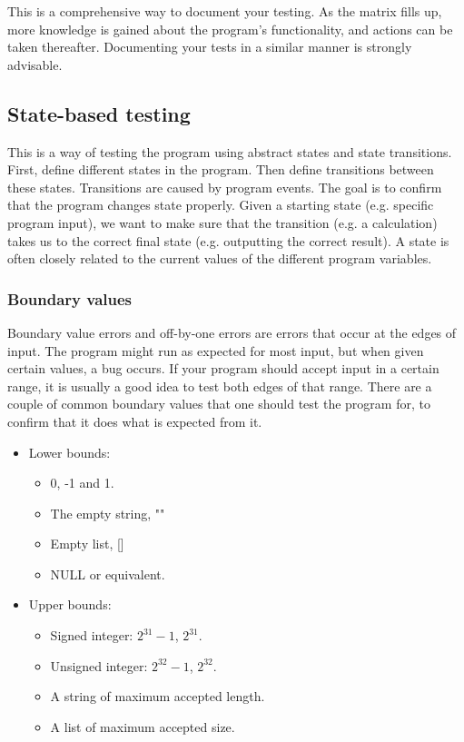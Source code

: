 \documentclass[11pt,a4paper,twoside]{article}
\begin{document}
This is a comprehensive way to document your testing. As the matrix fills up,
more knowledge is gained about the program’s functionality, and actions can be
taken thereafter. Documenting your tests in a similar manner is strongly
advisable.
 

\subsection{State-based testing}

This is a way of testing the program using abstract states and state
transitions. First, define different states in the program. Then define
transitions between these states. Transitions are caused by program events. The
goal is to confirm that the program changes state properly. Given a starting
state (e.g. specific program input), we want to make sure that the transition
(e.g. a calculation) takes us to the correct final state (e.g. outputting the
correct result). A state is often closely related to the current values of the
different program variables.
 

\subsubsection{Boundary values}

Boundary value errors and off-by-one errors are errors that occur at the edges
of input. The program might run as expected for most input, but when given
certain values, a bug occurs. If your program should accept input in a certain
range, it is usually a good idea to test both edges of that range. There are a
couple of common boundary values that one should test the program for, to
confirm that it does what is expected from it.

\begin{itemize}
    \item Lower bounds:
    \begin{itemize}
        \item 0, -1 and 1.
        \item The empty string, ""
        \item Empty list, []
        \item NULL or equivalent.
    \end{itemize}
    \item Upper bounds:
    \begin {itemize}
        \item Signed integer: $2^{31}-1$, $2^{31}$.
        \item Unsigned integer: $2^{32}-1$, $2^{32}$.
        \item A string of maximum accepted length.
        \item A list of maximum accepted size.
    \end{itemize}
\end{itemize}
\end{document}
